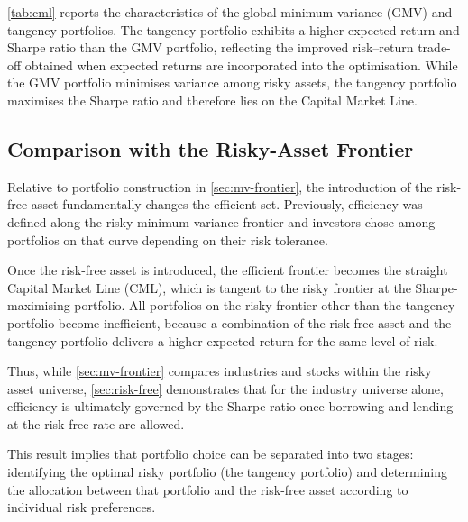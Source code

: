 \documentclass[11pt]{exam}
\begin{document}

\autoref{tab:cml} reports the characteristics of the global minimum variance (GMV) and tangency portfolios. The tangency portfolio exhibits a higher expected return and Sharpe ratio than the GMV portfolio, reflecting the improved risk–return trade-off obtained when expected returns are incorporated into the optimisation. While the GMV portfolio minimises variance among risky assets, the tangency portfolio maximises the Sharpe ratio and therefore lies on the Capital Market Line.

\clearpage
\subsection{Comparison with the Risky-Asset Frontier}

\noindent Relative to portfolio construction in \autoref{sec:mv-frontier}, the introduction of the risk-free asset fundamentally changes the efficient set. Previously, efficiency was defined along the risky minimum-variance frontier and investors chose among portfolios on that curve depending on their risk tolerance.

\noindent Once the risk-free asset is introduced, the efficient frontier becomes the straight Capital Market Line (CML), which is tangent to the risky frontier at the Sharpe-maximising portfolio. All portfolios on the risky frontier other than the tangency portfolio become inefficient, because a combination of the risk-free asset and the tangency portfolio delivers a higher expected return for the same level of risk.

\noindent Thus, while \autoref{sec:mv-frontier} compares industries and stocks within the risky asset universe, 
\autoref{sec:risk-free} demonstrates that for the industry universe alone, efficiency is ultimately 
governed by the Sharpe ratio once borrowing and lending at the risk-free rate 
are allowed.

This result implies that portfolio choice can be separated into two stages: identifying the optimal risky portfolio (the tangency portfolio) and determining the allocation between that portfolio and the risk-free asset according to individual risk preferences.
\end{document}
